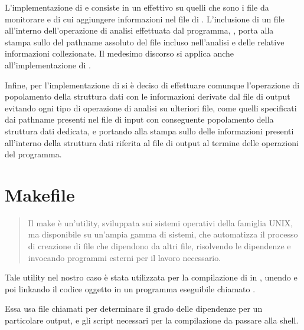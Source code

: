 \documentclass[letterpaper,10pt,italian,openany,oneside]{sphinxmanual}
\begin{document}
L’implementazione di  e  consiste in un  effettivo su quelli che sono i file da monitorare e di cui aggiungere informazioni nel file di .
L’inclusione di un file all’interno dell’operazione di analisi effettuata dal programma, , porta alla stampa sullo  del pathname assoluto del file incluso nell’analisi
e delle relative informazioni collezionate.
Il medesimo discorso si applica anche all’implementazione di .

Infine, per l’implementazione di  si è deciso di effettuare comunque l’operazione di popolamento della struttura dati con le informazioni derivate dal file di output evitando ogni tipo
di operazione di analisi su ulteriori file, come quelli specificati dai pathname presenti nel file di input con conseguente popolamento della struttura dati dedicata,
e portando alla stampa sullo  delle informazioni presenti all’interno della struttura dati riferita al file di output al termine delle operazioni del programma.


\section{Makefile}
\label{\detokenize{project:makefile}}\begin{quote}

Il make è un’utility, sviluppata sui sistemi operativi della famiglia UNIX, ma disponibile su un’ampia gamma di sistemi, che automatizza
il processo di creazione di file che dipendono da altri file, risolvendo le dipendenze e invocando programmi esterni per il lavoro necessario.
\end{quote}

Tale utility nel nostro caso è stata utilizzata per la compilazione di  in , unendo e poi linkando il codice oggetto
in un programma eseguibile chiamato .

Essa usa file chiamati  per determinare il grado delle dipendenze per un particolare output, e gli script
necessari per la compilazione da passare alla shell.
\end{document}
